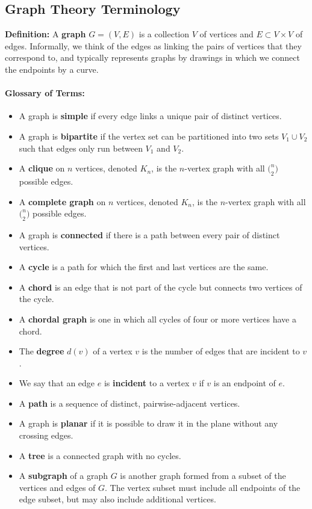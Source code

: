 \subsection{Graph Theory Terminology}
\textbf{Definition:} A \textbf{graph} $G=(V,E)$ is a collection $V$ of vertices and $E \subset V \times V$ of edges. Informally, we think of the edges as linking the pairs of vertices that they correspond to, and typically represents graphs by drawings in which we connect the endpoints by a curve.
\paragraph{Glossary of Terms:}
\begin{itemize}
\item A graph is \textbf{simple} if every edge links a unique pair of distinct vertices. 
\item A graph is \textbf{bipartite} if the vertex set can be partitioned into two sets $V_1 \cup V_2$ such that edges only run between $V_1$ and $V_2$.
\item A \textbf{clique} on $n$ vertices, denoted $K_n$, is the $n$-vertex graph with all $\bigl( _2^n \bigr)$ possible edges.
\item A \textbf{complete graph} on $n$ vertices, denoted $K_n$, is the $n$-vertex graph with all $\bigl( _2^n \bigr)$ possible edges.
\item A graph is \textbf{connected} if there is a path between every pair of distinct vertices.
\item A \textbf{cycle} is a path for which the first and last vertices are the same.
\item A \textbf{chord} is an edge that is not part of the cycle but connects two vertices of the cycle.
\item A \textbf{chordal graph} is one in which all cycles of four or more vertices have a chord.
\item The \textbf{degree} $d(v)$ of a vertex $v$ is the number of edges that are incident to $v$.
\item We say that an edge $e$ is \textbf{incident} to a vertex $v$ if $v$ is an endpoint of $e$.
\item A \textbf{path} is a sequence of distinct, pairwise-adjacent vertices.
\item A graph is \textbf{planar} if it is possible to draw it in the plane without any crossing edges.
\item A \textbf{tree} is a connected graph with no cycles.
\item A \textbf{subgraph} of a graph $G$ is another graph formed from a subset of the vertices and edges of $G$. The vertex subset must include all endpoints of the edge subset, but may also include additional vertices.

\end{itemize}
